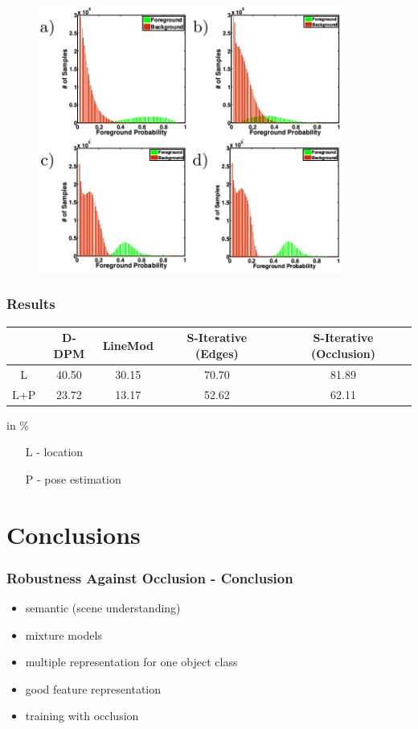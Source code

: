 \documentclass[xcolor=dvipsnames]{beamer}
\begin{document}
\begin{frame}
	\begin{figure}
	\includegraphics[width=10cm]{img/rir_1.png}
	\end{figure}
\end{frame}

\begin{frame}
	\frametitle{Results}
	
	\begin{center}
		\small
		\begin{tabular}{c|c|c|c|c}
			& D-DPM & LineMod & S-Iterative (Edges) & S-Iterative (Occlusion) \\
			\hline
			L & 40.50 & 30.15 & 70.70 & 81.89 \\
			L+P & 23.72 & 13.17 & 52.62 & 62.11 \\
		\end{tabular}
		in $\%$
		\begin{itemize}
			\item[L - ] location
			\item[P - ] pose estimation
		\end{itemize}
	\end{center}
\end{frame}

\section{Conclusions}

\begin{frame}
	\frametitle{Robustness Against Occlusion - Conclusion}
	\Large
	\begin{itemize}
		\item semantic (scene understanding)
		\item mixture models
		\item multiple representation for one object class
		\item good feature representation
		\item training with occlusion
	\end{itemize}
\end{frame}
\end{document}
